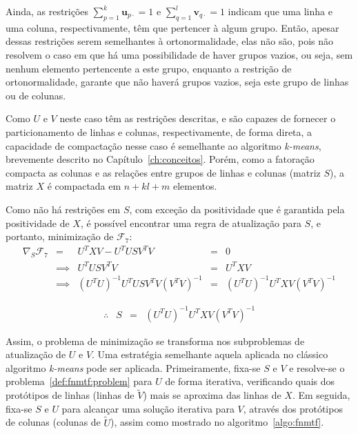 \documentclass[
    12pt,                %
    oneside,            %
    a4paper,            %
    english,            %
    brazil                %
    ]{abntex2ppgsi}
\begin{document}
Ainda, as restrições $\sum_{p=1}^{k} \mathbf{u}_{p \cdot} = 1$ e $\sum_{q=1}^{l} \mathbf{v}_{q \cdot} = 1$ indicam que uma linha e uma coluna, respectivamente, têm que pertencer à algum grupo.
Então, apesar dessas restrições serem semelhantes à ortonormalidade, elas não são, pois não resolvem o caso em que há uma possibilidade de haver grupos vazios, ou seja, sem nenhum elemento pertencente a este grupo, enquanto a restrição de ortonormalidade, garante que não haverá grupos vazios, seja este grupo de linhas ou de colunas.

Como $U$ e $V$ neste caso têm as restrições descritas, e são capazes de fornecer o particionamento de linhas e colunas, respectivamente, de forma direta, a capacidade de compactação nesse caso é semelhante ao algoritmo \textit{k-means}, brevemente descrito no Capítulo~\ref{ch:conceitos}.
Porém, como a fatoração compacta as colunas e as relações entre grupos de linhas e colunas (matriz $S$), a matriz $X$ é compactada em $n + kl + m$ elementos.

Como não há restrições em $S$, com exceção da positividade que é garantida pela positividade de $X$, é possível encontrar uma regra de atualização para $S$, e portanto, minimização de $\mathcal{F}_7$:
\[
    \begin{array}{lclcl}
        \nabla_S \mathcal{F}_7 &     =    & U^T X V - U^T U S V^T V                     & = & 0                             \\
                               & \implies & U^T U S V^T V                               & = & U^T X V                       \\
                               & \implies & (U^T U)^{-1} U^T U S V^T V (V^T V)^{-1} & = & (U^T U)^{-1} U^T X V (V^T V)^{-1}
    \end{array}   \nonumber
\]

\begin{equation}
\label{eq:fnmtf:updateS}
\begin{array}{lclcl}
\therefore & S & = & (U^T U)^{-1} U^T X V (V^T V)^{-1}    \nonumber
\end{array}
\end{equation}

Assim, o problema de minimização se transforma nos subproblemas de atualização de $U$ e $V$.
Uma estratégia semelhante aquela aplicada no clássico algoritmo \textit{k-means} pode ser aplicada.
Primeiramente, fixa-se $S$ e $V$ e resolve-se o problema~\ref{def:fnmtf:problem} para $U$ de forma iterativa, verificando quais dos protótipos de linhas (linhas de $\widetilde{V}$) mais se aproxima das linhas de $X$.
Em seguida, fixa-se $S$ e $U$ para alcançar uma solução iterativa para $V$, através dos protótipos de colunas (colunas de $\widetilde{U}$), assim como mostrado no algoritmo~\ref{algo:fnmtf}.
\end{document}
